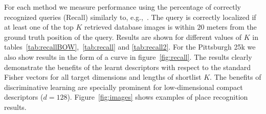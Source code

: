 \documentclass[10pt,twocolumn,letterpaper]{article}
\begin{document}
      For each method we measure performance using the percentage of correctly recognized queries (Recall) similarly to, e.g.,~\cite{Chen11,Knopp2010,Sattler-BMVC12}. The query is correctly localized if at least one of the top $K$ retrieved database images is within $20$ meters from the ground truth position of the query. Results are shown for different values of $K$ in tables~\ref{tab:recallBOW},~\ref{tab:recall} and \ref{tab:recall2}. For the Pittsburgh 25k we also show results in the form of a curve in figure~\ref{fig:recall}. The results clearly demonstrate the benefits of the learnt descriptors with respect to the standard Fisher vectors for all target dimensions and lengths of shortlist $K$. The benefits of discriminative learning are specially prominent for low-dimensional compact descriptors ($d=128$). Figure~\ref{fig:images} shows examples of place recognition results.
\end{document}
